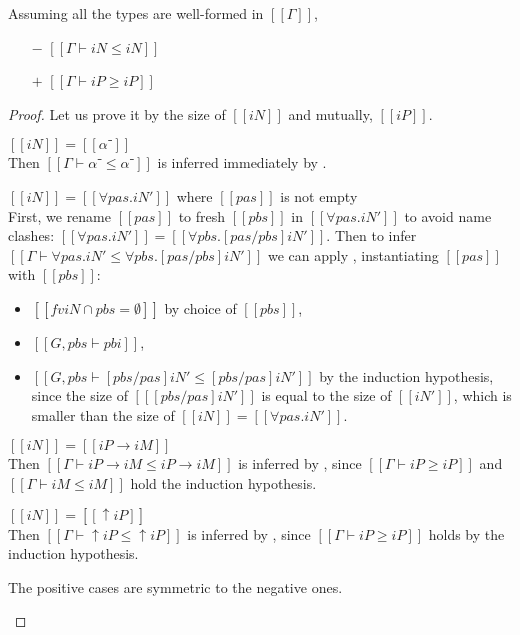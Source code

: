 \begin{corollary}
\begin{lemma} \label{lemma:subtyping-reflexivity}
  Assuming all the types are well-formed in $[[Γ]]$,
  \begin{itemize}
    \item [$-$] $[[Γ ⊢ iN ≤ iN]]$
    \item [$+$] $[[Γ ⊢ iP ≥ iP]]$
  \end{itemize}
\end{lemma}
\begin{proof}
  Let us prove it by the size of $[[iN]]$ and mutually, $[[iP]]$.
  \begin{caseof}
    \item $[[iN]] = [[α⁻]]$\\
      Then $[[Γ ⊢ α⁻ ≤ α⁻]]$ is inferred immediately by .
    \item $[[iN]] = [[∀pas.iN']]$ where $[[pas]]$ is not empty\\
      First, we rename $[[pas]]$ to fresh $[[pbs]]$ in $[[∀pas.iN']]$ to avoid
      name clashes: $[[∀pas.iN']] = [[∀pbs.[pas/pbs]iN']]$.
      Then to infer $[[Γ ⊢ ∀pas.iN' ≤ ∀pbs.[pas/pbs]iN']]$ we can apply 
      , instantiating $[[pas]]$ with $[[pbs]]$:
      \begin{itemize}
        \item $[[fv iN ∩ {pbs} = ∅ ]]$ by choice of $[[pbs]]$,
        \item $[[G, pbs ⊢ pbi]]$,
        \item $[[G, pbs ⊢ [pbs/pas] iN' ≤ [pbs/pas] iN']]$ by the induction hypothesis,
        since the size of $[[ [pbs/pas]iN' ]]$ is equal to the size of $[[iN']]$,
        which is smaller than the size of $[[iN]] = [[∀pas.iN']]$.
      \end{itemize}
    \item $[[iN]] = [[iP → iM]]$\\
      Then $[[Γ ⊢ iP → iM ≤ iP → iM]]$ is inferred by ,
      since $[[Γ ⊢ iP ≥ iP]]$ and $[[Γ ⊢ iM ≤ iM]]$ hold the induction hypothesis. 
    \item $[[iN]] = [[↑iP]]$\\
      Then $[[Γ ⊢ ↑iP ≤ ↑iP]]$ is inferred by ,
      since $[[Γ ⊢ iP ≥ iP]]$ holds by the induction hypothesis.
    \item The positive cases are symmetric to the negative ones.
  \end{caseof}
\end{proof}


\end{corollary}
